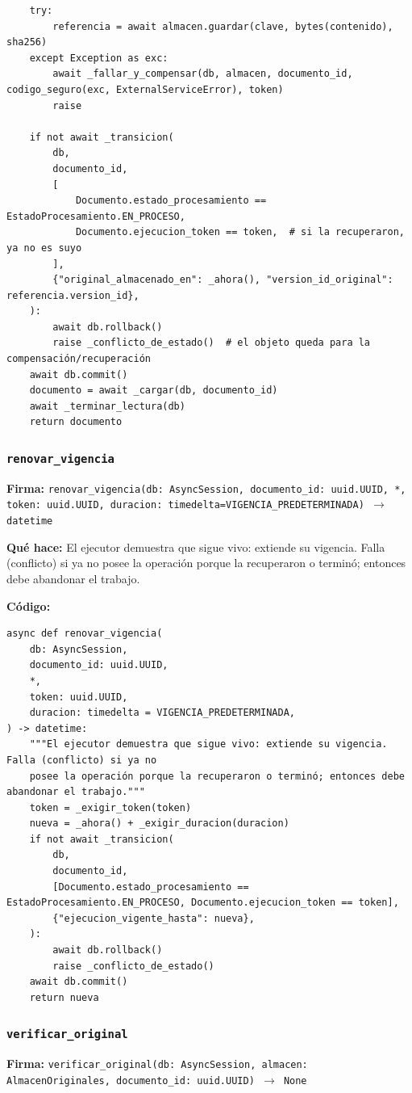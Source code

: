 \documentclass[11pt,a4paper]{article}
\begin{document}
\begin{lstlisting}
    try:
        referencia = await almacen.guardar(clave, bytes(contenido), sha256)
    except Exception as exc:
        await _fallar_y_compensar(db, almacen, documento_id, codigo_seguro(exc, ExternalServiceError), token)
        raise

    if not await _transicion(
        db,
        documento_id,
        [
            Documento.estado_procesamiento == EstadoProcesamiento.EN_PROCESO,
            Documento.ejecucion_token == token,  # si la recuperaron, ya no es suyo
        ],
        {"original_almacenado_en": _ahora(), "version_id_original": referencia.version_id},
    ):
        await db.rollback()
        raise _conflicto_de_estado()  # el objeto queda para la compensación/recuperación
    await db.commit()
    documento = await _cargar(db, documento_id)
    await _terminar_lectura(db)
    return documento
\end{lstlisting}

\subsubsection*{\texttt{renovar\_vigencia}}
\textbf{Firma:} \texttt{renovar\_vigencia(db: AsyncSession, documento\_id: uuid.UUID, *, token: uuid.UUID, duracion: timedelta=VIGENCIA\_PREDETERMINADA) $\rightarrow$ datetime}

\textbf{Qué hace:} El ejecutor demuestra que sigue vivo: extiende su vigencia. Falla (conflicto) si ya no
posee la operación porque la recuperaron o terminó; entonces debe abandonar el trabajo.

\textbf{Código:}
\begin{lstlisting}
async def renovar_vigencia(
    db: AsyncSession,
    documento_id: uuid.UUID,
    *,
    token: uuid.UUID,
    duracion: timedelta = VIGENCIA_PREDETERMINADA,
) -> datetime:
    """El ejecutor demuestra que sigue vivo: extiende su vigencia. Falla (conflicto) si ya no
    posee la operación porque la recuperaron o terminó; entonces debe abandonar el trabajo."""
    token = _exigir_token(token)
    nueva = _ahora() + _exigir_duracion(duracion)
    if not await _transicion(
        db,
        documento_id,
        [Documento.estado_procesamiento == EstadoProcesamiento.EN_PROCESO, Documento.ejecucion_token == token],
        {"ejecucion_vigente_hasta": nueva},
    ):
        await db.rollback()
        raise _conflicto_de_estado()
    await db.commit()
    return nueva
\end{lstlisting}

\subsubsection*{\texttt{verificar\_original}}
\textbf{Firma:} \texttt{verificar\_original(db: AsyncSession, almacen: AlmacenOriginales, documento\_id: uuid.UUID) $\rightarrow$ None}
\end{document}
